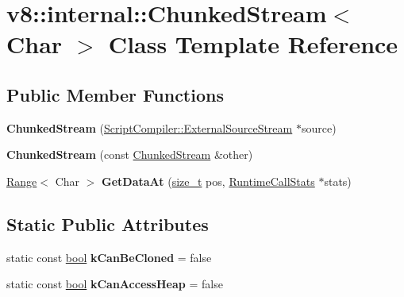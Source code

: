 \hypertarget{classv8_1_1internal_1_1ChunkedStream}{}\section{v8\+:\+:internal\+:\+:Chunked\+Stream$<$ Char $>$ Class Template Reference}
\label{classv8_1_1internal_1_1ChunkedStream}
\subsection*{Public Member Functions}
\begin{DoxyCompactItemize}
\item 
\mbox{\label{classv8_1_1internal_1_1ChunkedStream_a02995a6f72062e02ea459c39a761cfb0}} 
{\bfseries Chunked\+Stream} (\mbox{\hyperlink{classv8_1_1ScriptCompiler_1_1ExternalSourceStream}{Script\+Compiler\+::\+External\+Source\+Stream}} $\ast$source)
\item 
\mbox{\label{classv8_1_1internal_1_1ChunkedStream_a7cd0de357c58fa9f5f957ae809bd1957}} 
{\bfseries Chunked\+Stream} (const \mbox{\hyperlink{classv8_1_1internal_1_1ChunkedStream}{Chunked\+Stream}} \&other)
\item 
\mbox{\label{classv8_1_1internal_1_1ChunkedStream_a5d5a1b08fb9282069743d177a20f9eb1}} 
\mbox{\hyperlink{structv8_1_1internal_1_1Range}{Range}}$<$ Char $>$ {\bfseries Get\+Data\+At} (\mbox{\hyperlink{classsize__t}{size\+\_\+t}} pos, \mbox{\hyperlink{classv8_1_1internal_1_1RuntimeCallStats}{Runtime\+Call\+Stats}} $\ast$stats)
\end{DoxyCompactItemize}
\subsection*{Static Public Attributes}
\begin{DoxyCompactItemize}
\item 
\mbox{\label{classv8_1_1internal_1_1ChunkedStream_a374320dbb29afeb900553ff2e3de6d88}} 
static const \mbox{\hyperlink{classbool}{bool}} {\bfseries k\+Can\+Be\+Cloned} = false
\item 
\mbox{\label{classv8_1_1internal_1_1ChunkedStream_a6d164b4088d99db6a192512287b87437}} 
static const \mbox{\hyperlink{classbool}{bool}} {\bfseries k\+Can\+Access\+Heap} = false
\end{DoxyCompactItemize}
